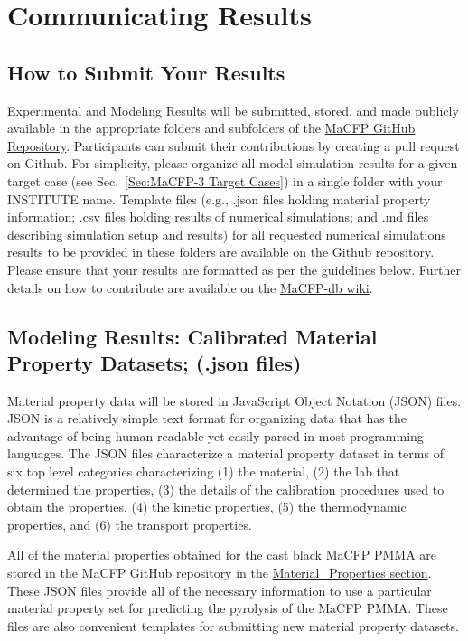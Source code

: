 \documentclass[12pt]{article}
\begin{document}
\clearpage
\section{Communicating Results}
\label{Sec:Com-Results}
\subsection{How to Submit Your Results}
Experimental and Modeling Results will be submitted, stored, and made publicly available in the appropriate folders and subfolders of the \href{https://github.com/MaCFP/}{MaCFP GitHub Repository}. Participants can submit their contributions by creating a pull request on Github. For simplicity, please organize all model simulation results for a given target case (see Sec.~\ref{Sec:MaCFP-3 Target Cases}) in a single folder with your INSTITUTE name.  Template files (e.g., .json files holding material property information; .csv files holding results of numerical simulations; and .md files describing simulation setup and results) for all requested numerical simulations results to be provided in these folders are available on the Github repository. Please ensure that your results are formatted as per the guidelines below. Further details on how to contribute are available on the \href{https://github.com/MaCFP/macfp-db/wiki/How-to-Contribute}{MaCFP-db wiki}.

\subsection{Modeling Results: Calibrated Material Property Datasets; (.json files)}

Material property data will be stored in JavaScript Object Notation (JSON) files. JSON is a relatively simple text format for organizing data that has the advantage of being human-readable yet easily parsed in most programming languages. The JSON files characterize a material property dataset in terms of six top level categories characterizing (1) the material, (2) the lab that determined the properties, (3) the details of the calibration procedures used to obtain the properties, (4) the kinetic properties, (5) the thermodynamic properties, and (6) the transport properties.

All of the material properties obtained for the cast black MaCFP PMMA are stored in the MaCFP GitHub repository in the \href{https://github.com/MaCFP/matl-db/tree/master/PMMA/Material_Properties}{Material\_Properties section}. These JSON files provide all of the necessary information to use a particular material property set for predicting the pyrolysis of the MaCFP PMMA. These files are also convenient templates for submitting new material property datasets.
\end{document}
